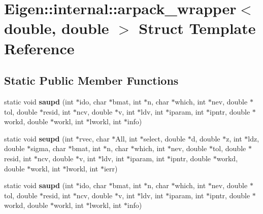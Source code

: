 \hypertarget{struct_eigen_1_1internal_1_1arpack__wrapper_3_01double_00_01double_01_4}{}\section{Eigen\+:\+:internal\+:\+:arpack\+\_\+wrapper$<$ double, double $>$ Struct Template Reference}
\label{struct_eigen_1_1internal_1_1arpack__wrapper_3_01double_00_01double_01_4}
\subsection*{Static Public Member Functions}
\begin{DoxyCompactItemize}
\item 
\mbox{\label{struct_eigen_1_1internal_1_1arpack__wrapper_3_01double_00_01double_01_4_ac2165e8202138e0709aa7515a1ccaddf}} 
static void {\bfseries saupd} (int $\ast$ido, char $\ast$bmat, int $\ast$n, char $\ast$which, int $\ast$nev, double $\ast$tol, double $\ast$resid, int $\ast$ncv, double $\ast$v, int $\ast$ldv, int $\ast$iparam, int $\ast$ipntr, double $\ast$workd, double $\ast$workl, int $\ast$lworkl, int $\ast$info)
\item 
\mbox{\label{struct_eigen_1_1internal_1_1arpack__wrapper_3_01double_00_01double_01_4_a79f34b55ad545b2db0d273bf279b0ba5}} 
static void {\bfseries seupd} (int $\ast$rvec, char $\ast$All, int $\ast$select, double $\ast$d, double $\ast$z, int $\ast$ldz, double $\ast$sigma, char $\ast$bmat, int $\ast$n, char $\ast$which, int $\ast$nev, double $\ast$tol, double $\ast$resid, int $\ast$ncv, double $\ast$v, int $\ast$ldv, int $\ast$iparam, int $\ast$ipntr, double $\ast$workd, double $\ast$workl, int $\ast$lworkl, int $\ast$ierr)
\item 
\mbox{\label{struct_eigen_1_1internal_1_1arpack__wrapper_3_01double_00_01double_01_4_ac2165e8202138e0709aa7515a1ccaddf}} 
static void {\bfseries saupd} (int $\ast$ido, char $\ast$bmat, int $\ast$n, char $\ast$which, int $\ast$nev, double $\ast$tol, double $\ast$resid, int $\ast$ncv, double $\ast$v, int $\ast$ldv, int $\ast$iparam, int $\ast$ipntr, double $\ast$workd, double $\ast$workl, int $\ast$lworkl, int $\ast$info)

\end{DoxyCompactItemize}
